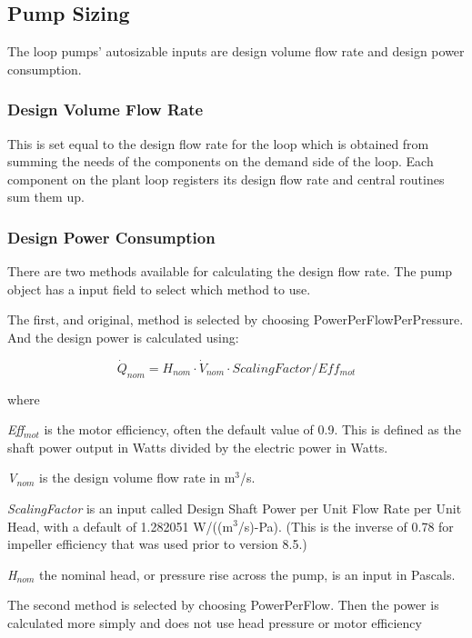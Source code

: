 \subsection{Pump Sizing}\label{pump-sizing}

The loop pumps' autosizable inputs are design volume flow rate and design power consumption.

\subsubsection{Design Volume Flow Rate}\label{design-volume-flow-rate}

This is set equal to the design flow rate for the loop which is obtained from summing the needs of the components on the demand side of the loop. Each component on the plant loop registers its design flow rate and central routines sum them up.

\subsubsection{Design Power Consumption}\label{design-power-consumption}

There are two methods available for calculating the design flow rate. The pump object has a input field to select which method to use.

The first, and original, method is selected by choosing PowerPerFlowPerPressure. And the design power is calculated using:

\begin{equation}
\dot Q_{nom} = H_{nom} \cdot \dot V_{nom} \cdot ScalingFactor /Eff_{mot}
\end{equation}

where

\emph{Eff\(_{mot}\)} is the motor efficiency, often the default value of 0.9. This is defined as the shaft power output in Watts divided by the electric power in Watts.

\emph{V\(_{nom}\)} is the design volume flow rate in m\(^{3}\)/s.

\emph{ScalingFactor} is an input called Design Shaft Power per Unit Flow Rate per Unit Head, with a default of 1.282051 W/((m\(^{3}\)/s)-Pa). (This is the inverse of 0.78 for impeller efficiency that was used prior to version 8.5.)

\emph{H\(_{nom}\)} the nominal head, or pressure rise across the pump, is an input in Pascals.

The second method is selected by choosing PowerPerFlow. Then the power is calculated more simply and does not use head pressure or motor efficiency

